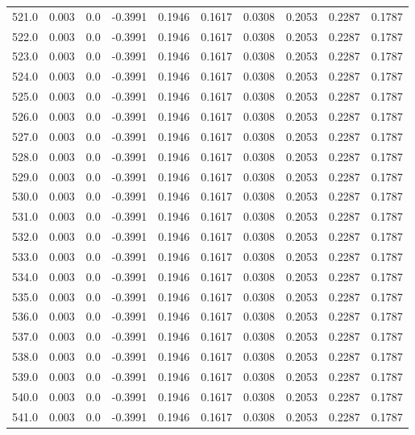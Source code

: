 \begin{longtable}{lrrrrrrrrr}
521.0 & 0.003 & 0.0 & -0.3991 & 0.1946 & 0.1617 & 0.0308 & 0.2053 & 0.2287 & 0.1787 \\
522.0 & 0.003 & 0.0 & -0.3991 & 0.1946 & 0.1617 & 0.0308 & 0.2053 & 0.2287 & 0.1787 \\
523.0 & 0.003 & 0.0 & -0.3991 & 0.1946 & 0.1617 & 0.0308 & 0.2053 & 0.2287 & 0.1787 \\
524.0 & 0.003 & 0.0 & -0.3991 & 0.1946 & 0.1617 & 0.0308 & 0.2053 & 0.2287 & 0.1787 \\
525.0 & 0.003 & 0.0 & -0.3991 & 0.1946 & 0.1617 & 0.0308 & 0.2053 & 0.2287 & 0.1787 \\
526.0 & 0.003 & 0.0 & -0.3991 & 0.1946 & 0.1617 & 0.0308 & 0.2053 & 0.2287 & 0.1787 \\
527.0 & 0.003 & 0.0 & -0.3991 & 0.1946 & 0.1617 & 0.0308 & 0.2053 & 0.2287 & 0.1787 \\
528.0 & 0.003 & 0.0 & -0.3991 & 0.1946 & 0.1617 & 0.0308 & 0.2053 & 0.2287 & 0.1787 \\
529.0 & 0.003 & 0.0 & -0.3991 & 0.1946 & 0.1617 & 0.0308 & 0.2053 & 0.2287 & 0.1787 \\
530.0 & 0.003 & 0.0 & -0.3991 & 0.1946 & 0.1617 & 0.0308 & 0.2053 & 0.2287 & 0.1787 \\
531.0 & 0.003 & 0.0 & -0.3991 & 0.1946 & 0.1617 & 0.0308 & 0.2053 & 0.2287 & 0.1787 \\
532.0 & 0.003 & 0.0 & -0.3991 & 0.1946 & 0.1617 & 0.0308 & 0.2053 & 0.2287 & 0.1787 \\
533.0 & 0.003 & 0.0 & -0.3991 & 0.1946 & 0.1617 & 0.0308 & 0.2053 & 0.2287 & 0.1787 \\
534.0 & 0.003 & 0.0 & -0.3991 & 0.1946 & 0.1617 & 0.0308 & 0.2053 & 0.2287 & 0.1787 \\
535.0 & 0.003 & 0.0 & -0.3991 & 0.1946 & 0.1617 & 0.0308 & 0.2053 & 0.2287 & 0.1787 \\
536.0 & 0.003 & 0.0 & -0.3991 & 0.1946 & 0.1617 & 0.0308 & 0.2053 & 0.2287 & 0.1787 \\
537.0 & 0.003 & 0.0 & -0.3991 & 0.1946 & 0.1617 & 0.0308 & 0.2053 & 0.2287 & 0.1787 \\
538.0 & 0.003 & 0.0 & -0.3991 & 0.1946 & 0.1617 & 0.0308 & 0.2053 & 0.2287 & 0.1787 \\
539.0 & 0.003 & 0.0 & -0.3991 & 0.1946 & 0.1617 & 0.0308 & 0.2053 & 0.2287 & 0.1787 \\
540.0 & 0.003 & 0.0 & -0.3991 & 0.1946 & 0.1617 & 0.0308 & 0.2053 & 0.2287 & 0.1787 \\
541.0 & 0.003 & 0.0 & -0.3991 & 0.1946 & 0.1617 & 0.0308 & 0.2053 & 0.2287 & 0.1787 \\

\end{longtable}
